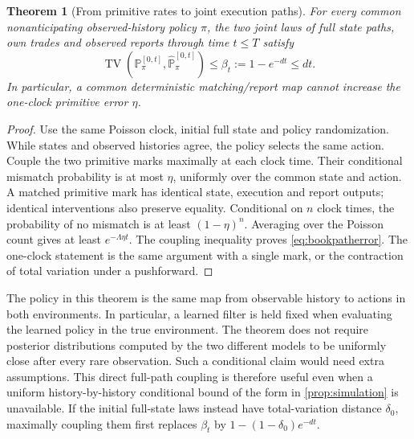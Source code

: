 \documentclass[11pt]{article}
\numberwithin{equation}{section}
\newtheorem{theorem}{Theorem}[section]
\theoremstyle{definition}
\theoremstyle{remark}
\theoremstyle{definition}
\newcommand{\TV}{\operatorname{TV}}
\begin{document}
\begin{theorem}[From primitive rates to joint execution paths]\label{thm:bookcoupling}
For every common nonanticipating observed-history policy $\pi$, the two
joint laws of full state paths, own trades and observed reports through time
$t\le T$ satisfy
\begin{equation}\label{eq:bookpatherror}
 \TV(\mathbb P_\pi^{[0,t]},\widehat{\mathbb P}_\pi^{[0,t]})
       \le\beta_t:=1-e^{-dt}\le dt.
\end{equation}
In particular, a common deterministic matching/report map cannot increase
the one-clock primitive error $\eta$.
\end{theorem}
\begin{proof}
Use the same Poisson clock, initial full state and policy randomization.
While states and observed histories agree, the policy selects the same
action. Couple the two primitive marks maximally at each clock time. Their
conditional mismatch probability is at most $\eta$, uniformly over the
common state and action. A matched primitive mark has identical state,
execution and report outputs; identical interventions also preserve equality.
Conditional on $n$ clock times, the probability of no mismatch is at least
$(1-\eta)^n$. Averaging over the Poisson count gives at least
$e^{-\Lambda\eta t}$. The coupling inequality proves
\eqref{eq:bookpatherror}. The one-clock statement is the same argument with
a single mark, or the contraction of total variation under a pushforward.
\end{proof}

The policy in this theorem is the same map from observable history to
actions in both environments. In particular, a learned filter is held fixed
when evaluating the learned policy in the true environment. The theorem
does not require posterior distributions computed by the two different
models to be uniformly close after every rare observation. Such a
conditional claim would need extra assumptions. This direct full-path
coupling is therefore useful even when a uniform history-by-history
conditional bound of the form in \cref{prop:simulation} is unavailable.
If the initial full-state laws instead have total-variation distance
$\delta_0$, maximally coupling them first replaces $\beta_t$ by
$1-(1-\delta_0)e^{-dt}$.
\end{document}
